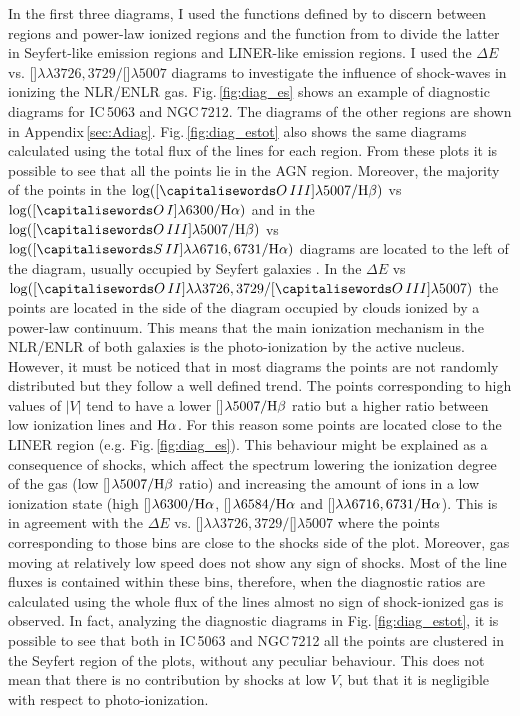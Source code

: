 \documentclass[../main.tex]{subfiles}
\begin{document}
In the first three diagrams, I used the functions defined by \citet{Kewley01} to discern between  regions and power-law ionized regions and the function from \citet{Kewley06} to divide the latter in Seyfert-like emission regions and LINER-like emission regions.
I used the $\Delta E$ vs. []$\lambda\lambda3726,3729/$[]$\lambda5007$ diagrams to investigate the influence of shock-waves in ionizing the NLR/ENLR gas.
Fig.\,\ref{fig:diag_es} shows an example of diagnostic diagrams for IC\,5063 and NGC\,7212.
The diagrams of the other regions are shown in Appendix\,\ref{sec:Adiag}.
Fig.\,\ref{fig:diag_estot} also shows the same diagrams calculated using the total flux of the lines for each region.
From these plots it is possible to see that all the points lie in the AGN region.
Moreover, the majority of the points in the $\log([\ion{O}{III}]\lambda5007/\Hb)$ vs $\log([\ion{O}{I}]\lambda6300/\Ha)$ and in the $\log([\ion{O}{III}]\lambda5007/\Hb)$ vs $\log([\ion{S}{II}]\lambda\lambda6716,6731/\Ha)$ diagrams are located to the left of the diagram, usually occupied by Seyfert galaxies \citep{Kewley06}.
In the $\Delta E$ vs $\log([\ion{O}{II}]\lambda\lambda3726,3729/[\ion{O}{III}]\lambda5007)$ the points are located in the side of the diagram occupied by clouds ionized by a power-law continuum.
This means that the main ionization mechanism in the NLR/ENLR of both galaxies is the photo-ionization by the active nucleus.
However, it must be noticed that in most diagrams the points are not randomly distributed but they follow a well defined trend.
The points corresponding to high values of $\lvert V \lvert$ tend to have a lower []$\lambda5007/\rm H\beta$ ratio but a higher ratio between low ionization lines and $\rm H\alpha$.  
For this reason some points are located close to the LINER region (e.g. Fig.\,\ref{fig:diag_es}).
This behaviour might be explained as a consequence of shocks, which affect the spectrum lowering the ionization degree of the gas (low []$\lambda5007/\rm H\beta$ ratio) and increasing the amount of ions in a low ionization state (high []$\lambda6300/\rm H\alpha$, []$\lambda6584/\rm H\alpha$ and []$\lambda\lambda6716,6731/\rm H\alpha$).
This is in agreement with the $\Delta E$ vs. []$\lambda\lambda3726,3729/$[]$\lambda5007$ where the points corresponding to those bins are close to the shocks side of the plot.
Moreover, gas moving at relatively low speed does not show any sign of shocks.
Most of the line fluxes is contained within these bins, therefore, when the diagnostic ratios are calculated using the whole flux of the lines almost no sign of shock-ionized gas is observed.
In fact, analyzing the diagnostic diagrams in Fig.\,\ref{fig:diag_estot}, it is possible to see that both in IC\,5063 and NGC\,7212 all the points are clustered in the Seyfert region of the plots, without any peculiar behaviour.
This does not mean that there is no contribution by shocks at low $V$, but that it is negligible with respect to photo-ionization. 
\end{document}
